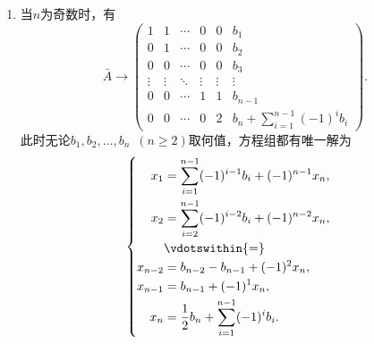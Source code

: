 \documentclass[12pt,fontset=fandol]{ctexart}
\begin{document}
\begin{solve}
\begin{enumerate}
                \item 当$n$为奇数时，有
                      \[ \bar{A}\rightarrow\begin{pmatrix}
                              1      & 1      & \cdots & 0      & 0      & b_1                                        \\
                              0      & 1      & \cdots & 0      & 0      & b_2                                        \\
                              0      & 0      & \cdots & 0      & 0      & b_3                                        \\
                              \vdots & \vdots & \ddots & \vdots & \vdots & \vdots                                     \\
                              0      & 0      & \cdots & 1      & 1      & b_{n-1}                                    \\
                              0      & 0      & \cdots & 0      & 2      & b_n+\displaystyle\sum_{i=1}^{n-1}(-1)^ib_i
                          \end{pmatrix}. \]
                      此时无论$b_1,b_2,\ldots,b_n\enspace(n\geqslant 2)$取何值，方程组都有唯一解为
                      \[\begin{cases} \begin{aligned}
                                  x_1     & =\displaystyle\sum_{i=1}^{n-1}(-1)^{i-1}b_i+(-1)^{n-1}x_n, \\
                                  x_2     & =\displaystyle\sum_{i=2}^{n-1}(-1)^{i-2}b_i+(-1)^{n-2}x_n, \\
                                          & \vdotswithin{ = }                                          \\
                                  x_{n-2} & =b_{n-2}-b_{n-1}+(-1)^2x_n,                                \\
                                  x_{n-1} & =b_{n-1}+(-1)^1x_n,                                        \\
                                  x_n     & =\frac 12b_n+\displaystyle\sum_{i=1}^{n-1}(-1)^ib_i.
                              \end{aligned} \end{cases}\]
            \end{enumerate}
\end{solve}
\end{document}
